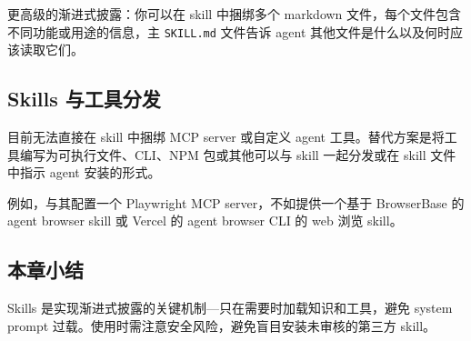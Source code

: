 更高级的渐进式披露：你可以在 skill 中捆绑多个 markdown 文件，每个文件包含不同功能或用途的信息，主 \texttt{SKILL.md} 文件告诉 agent 其他文件是什么以及何时应该读取它们。

\subsection{Skills 与工具分发}

目前无法直接在 skill 中捆绑 MCP server 或自定义 agent 工具。替代方案是将工具编写为可执行文件、CLI、NPM 包或其他可以与 skill 一起分发或在 skill 文件中指示 agent 安装的形式。

例如，与其配置一个 Playwright MCP server，不如提供一个基于 BrowserBase 的 agent browser skill 或 Vercel 的 agent browser CLI 的 web 浏览 skill。

\subsection{本章小结}

Skills 是实现渐进式披露的关键机制---只在需要时加载知识和工具，避免 system prompt 过载。使用时需注意安全风险，避免盲目安装未审核的第三方 skill。


